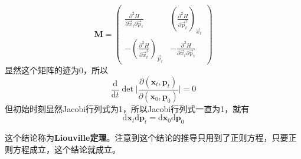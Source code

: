 \documentclass[12pt]{article}
\begin{document}
\begin{equation*}
    \bm{M} = 
    \begin{pmatrix}
    \frac {\partial^2 H}{\partial \vec{x}_t \partial \vec{p}_t} & (\frac {\partial^2 H}{\partial \vec{p}_t^2})_{\vec{x}_t}\\
    -(\frac {\partial^2 H}{\partial \vec{x}_t^2})_{\vec{p}_t} & - \frac {\partial^2 H}{\partial \vec{x}_t \partial \vec{p}_t}
    \end{pmatrix}
\end{equation*}
显然这个矩阵的迹为0，所以
\begin{equation*}
    \frac {\mathrm{d}}{\mathrm{d}t} \det \bigg|\frac {\partial (\bm{x}_t,\bm{p}_t)}{\partial (\bm{x}_0,\bm{p}_0)} \bigg| = 0
\end{equation*}
但初始时刻显然Jacobi行列式为1，所以Jacobi行列式一直为1，就有
\begin{equation*}
    \mathrm{d}\bm{x}_t \mathrm{d}\bm{p}_t = \mathrm{d}\bm{x}_0 \mathrm{d}\bm{p}_0
\end{equation*}

这个结论称为\textbf{Liouville定理}。注意到这个结论的推导只用到了正则方程，只要正则方程成立，这个结论就成立。
\end{document}
